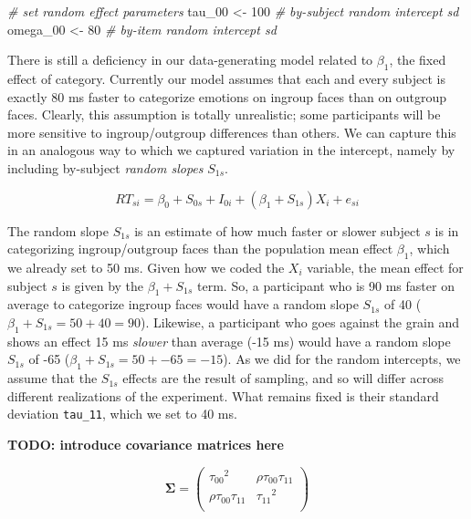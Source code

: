 \documentclass[doc,floatsintext]{apa6}
\newenvironment{Shaded}{\begin{snugshade}}{\end{snugshade}}
\newcommand{\DecValTok}[1]{\textcolor[rgb]{0.00,0.00,0.81}{#1}}
\newcommand{\StringTok}[1]{\textcolor[rgb]{0.31,0.60,0.02}{#1}}
\newcommand{\CommentTok}[1]{\textcolor[rgb]{0.56,0.35,0.01}{\textit{#1}}}
\newcommand{\NormalTok}[1]{#1}
\begin{document}
\begin{Shaded}
\begin{Highlighting}[]
\CommentTok{# set random effect parameters}
\NormalTok{tau_}\DecValTok{00}\NormalTok{ <-}\StringTok{ }\DecValTok{100} \CommentTok{# by-subject random intercept sd}
\NormalTok{omega_}\DecValTok{00}\NormalTok{ <-}\StringTok{  }\DecValTok{80} \CommentTok{# by-item random intercept sd}
\end{Highlighting}
\end{Shaded}

There is still a deficiency in our data-generating model related to
\(\beta_1\), the fixed effect of category. Currently our model assumes
that each and every subject is exactly 80 ms faster to categorize
emotions on ingroup faces than on outgroup faces. Clearly, this
assumption is totally unrealistic; some participants will be more
sensitive to ingroup/outgroup differences than others. We can capture
this in an analogous way to which we captured variation in the
intercept, namely by including by-subject \emph{random slopes}
\(S_{1s}\).

\begin{equation}
RT_{si} = \beta_0 + S_{0s} + I_{0i} + \left(\beta_1 + S_{1s}\right) X_i + e_{si}
\end{equation}

The random slope \(S_{1s}\) is an estimate of how much faster or slower
subject \(s\) is in categorizing ingroup/outgroup faces than the
population mean effect \(\beta_1\), which we already set to 50 ms. Given
how we coded the \(X_i\) variable, the mean effect for subject \(s\) is
given by the \(\beta_1 + S_{1s}\) term. So, a participant who is 90 ms
faster on average to categorize ingroup faces would have a random slope
\(S_{1s}\) of 40 (\(\beta_1 + S_{1s} = 50 + 40 = 90\)). Likewise, a
participant who goes against the grain and shows an effect 15 ms
\emph{slower} than average (-15 ms) would have a random slope \(S_{1s}\)
of -65 (\(\beta_1 + S_{1s} = 50 + -65 = -15\)). As we did for the random
intercepts, we assume that the \(S_{1s}\) effects are the result of
sampling, and so will differ across different realizations of the
experiment. What remains fixed is their standard deviation
\texttt{tau\_11}, which we set to 40 ms.

\textbf{TODO: introduce covariance matrices here}

\begin{equation}
\mathbf{\Sigma} = \left(\begin{array}{cc}{\tau_{00}}^2 & \rho\tau_{00}\tau_{11} \\
         \rho\tau_{00}\tau_{11} & {\tau_{11}}^2 \\
         \end{array}\right) 
\end{equation}
\end{document}

